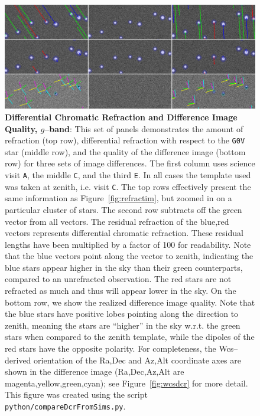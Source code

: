 \documentclass[DM,toc]{lsstdoc}
\def\A{{\tt A}}
\def\C{{\tt C}}
\def\E{{\tt E}}
\begin{document}
\begin{figure}[!ht]
  \centering
  \includegraphics[width=1.0\textwidth]{outputs8b_g_doPreConvolveFalse_dcr_crop.png}
  \caption{{\bf Differential Chromatic Refraction and Difference Image
      Quality, $g$--band}: This set of panels demonstrates the amount
    of refraction (top row), differential refraction with respect to
    the {\tt G0V} star (middle row), and the quality of the difference
    image (bottom row) for three sets of image differences.  The first
    column uses science visit \A, the middle \C, and the third \E.  In
    all cases the template used was taken at zenith, i.e. visit \C.
    The top rows effectively present the same information as
    Figure~\ref{fig:refractim}, but zoomed in on a particular cluster
    of stars.  The second row subtracts off the green vector from all
    vectors.  The residual refraction of the blue,red vectors
    represents differential chromatic refraction.  These residual
    lengths have been multiplied by a factor of 100 for readability.
    Note that the blue vectors point along the vector to zenith,
    indicating the blue stars appear higher in the sky than their
    green counterparts, compared to an unrefracted observation.  The
    red stars are not refracted as much and thus will appear lower in
    the sky.  On the bottom row, we show the realized difference image
    quality.  Note that the blue stars have positive lobes pointing
    along the direction to zenith, meaning the stars are ``higher'' in
    the sky w.r.t. the green stars when compared to the zenith
    template, while the dipoles of the red stars have the opposite
    polarity.  For completeness, the Wcs--derived orientation of the
    Ra,Dec and Az,Alt coordinate axes are shown in the difference
    image (Ra,Dec,Az,Alt are magenta,yellow,green,cyan); see
    Figure~\ref{fig:wcsdcr} for more detail.  This figure was created
    using the script {\tt python/compareDcrFromSims.py}.}
  \label{fig:dcrimg}
\end{figure}
\end{document}
